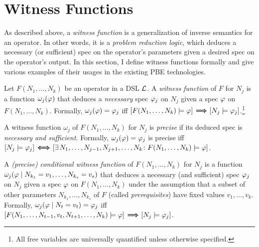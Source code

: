 \section{Witness Functions}
\label{sec:prose:wf}
As described above, a \emph{witness function} is a generalization of inverse semantics for an operator.
In other words, it is a \emph{problem reduction logic}, which deduces a necessary (or sufficient) spec on the operator's
parameters given a desired spec on the operator's output.
In this section, I define witness functions formally and give various examples of their usages in the existing PBE
technologies.

\begin{defn}
    Let $F(N_1,\dots,N_k)$ be an operator in a DSL $\mathcal{L}$.
    A \emph{witness function} of $F$ for $N_j$ is a function $\omega_{j}(\varphi)$ that deduces a \emph{necessary}
    spec $\varphi_j$ on $N_j$ given a spec $\varphi$ on $F(N_1, \dots, N_k)$.
    Formally, $\omega_j(\varphi) = \varphi_j$ iff $\left[F(N_1, \dots, N_k) \models \varphi\right] \,\mathrel{\pmb{\Longrightarrow}_{\!\!}}\!{} \left[N_j \models
    \varphi_j\right]$.\footnote{All free variables are universally quantified unless otherwise specified.}
\end{defn}

\begin{defn}
    A witness function $\omega_j$ of $F(N_1, \dots, N_k)$ for $N_j$ is \emph{precise} if its deduced spec is
    \emph{necessary and sufficient}.
    Formally, $\omega_j(\varphi) = \varphi_j$ is precise iff
    $\left[N_j \models \varphi_j\right] \,\mathrel{\pmb{\Longleftrightarrow}_{\!\!}}\!{} \left[\exists\, N_1, \dots, N_{j-1}, N_{j+1}, \dots, N_k\colon\allowbreak
        F(N_1, \dots, N_k) \models \varphi \right]$.
\end{defn}

\begin{defn}
    A \emph{(precise) conditional witness function} of $F(N_1, \dots, N_k)$ for $N_j$ is a function $\omega_j(\spec
    \assuming N_{k_1} = v_1, \dots, N_{k_s} = v_s)$ that deduces a necessary (and sufficient) spec $\varphi_j$ on $N_j$
    given a spec $\varphi$ on $F(N_1, \dots, N_k)$ under the assumption that a subset of other
    parameters $N_{k_1}, \dots, N_{k_s}$ of $F$ (called \emph{prerequisites}) have fixed values $v_1, \dots, v_k$.
    Formally, $\omega_j(\spec \assuming N_t = v_t) = \spec_j$ iff $\left[F(N_1, \dots, N_{t-1}, v_t, N_{t+1}, \dots,
    N_k) \models \varphi\right] \,\mathrel{\pmb{\Longrightarrow}_{\!\!}}\!{} \left[N_j \models \varphi_j\right]$.
\end{defn}

